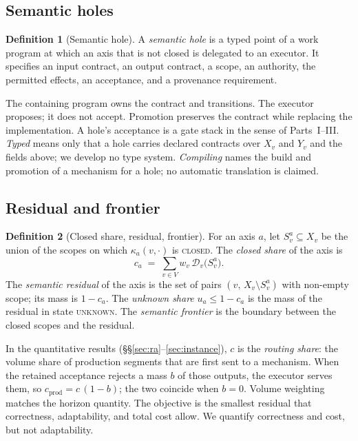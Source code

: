 \documentclass[11pt]{article}
\theoremstyle{definition}
\newtheorem{definition}{Definition}
\theoremstyle{remark}
\newcommand{\D}{\mathcal{D}}
\newcommand{\cstate}[1]{\textup{\textsc{#1}}}
\begin{document}
\subsection{Semantic holes}\label{sec:holes}
\begin{definition}[Semantic hole]\label{def:hole}
A \emph{semantic hole} is a typed point of a work program at which an axis that is not closed is
delegated to an executor. It specifies an input contract, an output contract, a scope, an authority,
the permitted effects, an acceptance, and a provenance requirement.
\end{definition}
The containing program owns the contract and transitions. The executor proposes; it does not accept.
Promotion preserves the contract while replacing the implementation.
A hole's acceptance is a gate stack in the sense of Parts~I--III.
\emph{Typed} means only that a hole carries declared contracts over $X_v$ and $Y_v$ and the fields
above; we develop no type system. \emph{Compiling} names the build and promotion of a mechanism for a
hole; no automatic translation is claimed.

\subsection{Residual and frontier}\label{sec:residual}
\begin{definition}[Closed share, residual, frontier]\label{def:residual}
For an axis $a$, let $S_v^a\subseteq X_v$ be the union of the scopes on which $\kappa_a(v,\cdot)$ is
\cstate{closed}. The \emph{closed share} of the axis is
\[
c_a\;=\;\sum_{v\in V} w_v\,\D_v\bigl(S_v^a\bigr).
\]
The \emph{semantic residual} of the axis is the set of pairs $(v,\,X_v\setminus S_v^a)$ with
non-empty scope; its mass is $1-c_a$. The \emph{unknown share} $u_a\le 1-c_a$ is the mass of the
residual in state \cstate{unknown}. The \emph{semantic frontier} is the boundary between the closed
scopes and the residual.
\end{definition}
In the quantitative results (\S\S\ref{sec:ra}--\ref{sec:instance}), $c$ is the \emph{routing share}:
the volume share of production segments that are first sent to a mechanism. When the retained
acceptance rejects a mass $b$ of those outputs, the executor serves them, so
$c_{\mathrm{prod}}=c\,(1-b)$; the two coincide when $b=0$. Volume weighting matches the horizon
quantity.
The objective is the smallest residual that correctness, adaptability, and total cost allow.
We quantify correctness and cost, but not adaptability.
\end{document}
